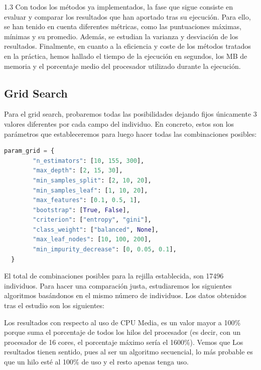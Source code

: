 \documentclass{article}
\begin{document}
\begin{spacing}{1.3}
Con todos los métodos ya implementados, la fase que sigue consiste en evaluar y comparar los resultados que han aportado
tras su ejecución. Para ello, se han tenido en cuenta diferentes métricas, como las puntuaciones máximas, mínimas y su promedio.
Además, se estudian la varianza y desviación de los resultados. Finalmente, en cuanto a la eficiencia y coste de los métodos
tratados en la práctica, hemos hallado el tiempo de la ejecución en segundos, los MB de memoria y el porcentaje medio
del procesador utilizado durante la ejecución.



\subsection{Grid Search}
Para el grid search, probaremos todas las posibilidades dejando fijos únicamente 3 valores diferentes por cada campo del individuo.
En concreto, estos son los parámetros que estableceremos para luego hacer todas las combinaciones posibles:

\begin{lstlisting}[language=Python, caption=Grid de parámetros]
  param_grid = {
        "n_estimators": [10, 155, 300],
        "max_depth": [2, 15, 30],
        "min_samples_split": [2, 10, 20],
        "min_samples_leaf": [1, 10, 20],
        "max_features": [0.1, 0.5, 1],
        "bootstrap": [True, False],
        "criterion": ["entropy", "gini"],
        "class_weight": ["balanced", None],
        "max_leaf_nodes": [10, 100, 200],
        "min_impurity_decrease": [0, 0.05, 0.1],
  }
\end{lstlisting}

El total de combinaciones posibles para la rejilla establecida, son 17496 individuos. Para hacer una comparación justa, estudiaremos
los siguientes algoritmos basándonos en el mismo número de individuos. Los datos obtenidos tras el estudio son los siguientes:\newline

\newline

Los resultados con respecto al uso de CPU Media, es un valor mayor a 100\% porque suma el porcentaje de todos
los hilos del procesador (es decir, con un procesador de 16 cores, el porcentaje máximo sería el 1600\%). Vemos que
Los resultados tienen sentido, pues al ser un algoritmo secuencial, lo más probable es que un hilo esté al 100\%
de uso y el resto apenas tenga uso.\newline


\end{spacing}
\end{document}
